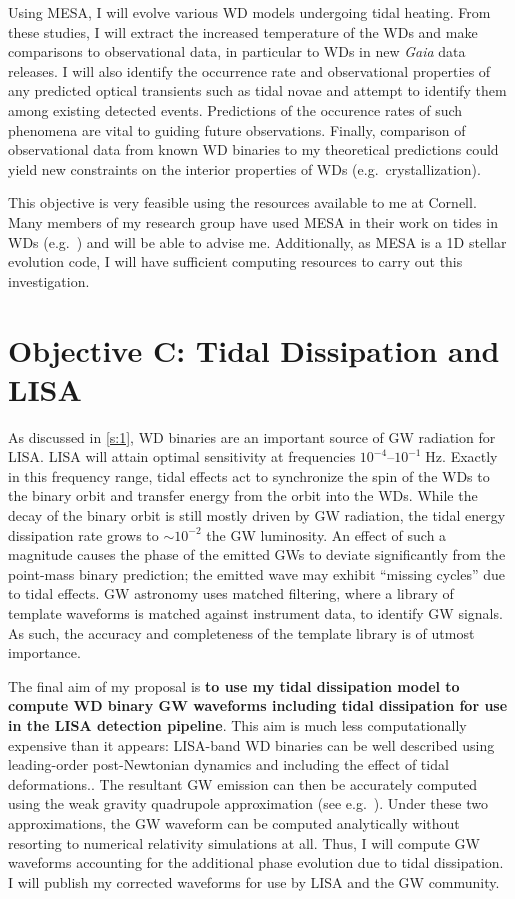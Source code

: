 \documentclass[12pt,
        usenames, %
        dvipsnames %
    ]{article}
\begin{document}
Using MESA, I will evolve various WD models undergoing tidal heating. From these
studies, I will extract the increased temperature of the WDs and make
comparisons to observational data, in particular to WDs in new \emph{Gaia} data
releases. I will also identify the occurrence rate and observational properties
of any predicted optical transients such as tidal novae and attempt to identify
them among existing detected events. Predictions of the occurence rates of such
phenomena are vital to guiding future observations. Finally, comparison of
observational data from known WD binaries to my theoretical predictions could
yield new constraints on the interior properties of WDs (e.g.\ crystallization).

This objective is very feasible using the resources available to me at Cornell.
Many members of my research group have used MESA in their work on tides in WDs
(e.g.\ \cite{fullerII,fullerIV,vick}) and will be able to advise me.
Additionally, as MESA is a 1D stellar evolution code, I will have sufficient
computing resources to carry out this investigation.

\section{Objective C\@: Tidal Dissipation and LISA}\label{s:4}

As discussed in \autoref{s:1}, WD binaries are an important source of GW
radiation for LISA\@. LISA will attain optimal sensitivity at frequencies
$10^{-4}$--$10^{-1}\;\mathrm{Hz}$\cite{LISA_band}. Exactly in this frequency
range, tidal effects act to synchronize the spin of the WDs to the binary orbit
and transfer energy from the orbit into the WDs. While the decay of the binary
orbit is still mostly driven by GW radiation, the tidal energy dissipation rate
grows to $\sim10^{-2}$ the GW luminosity\cite{fullerII,fullerIV}. An effect of
such a magnitude causes the phase of the emitted GWs to deviate significantly
from the point-mass binary prediction; the emitted wave may exhibit ``missing
cycles'' due to tidal effects\cite{fullerII}. GW astronomy uses matched
filtering, where a library of template waveforms is matched against instrument
data, to identify GW signals. As such, the accuracy and completeness of the
template library is of utmost importance.

The final aim of my proposal is \textbf{to use my tidal dissipation model to
compute WD binary GW waveforms including tidal dissipation for use in the LISA
detection pipeline}. This aim is much less computationally expensive than it
appears: LISA-band WD binaries can be well described using leading-order
post-Newtonian dynamics and including the effect of tidal
deformations.\cite{DWD_pointmass}. The resultant GW emission can then be
accurately computed using the weak gravity quadrupole approximation (see
e.g.~\cite{peters,lsst_wd}). Under these two approximations, the GW waveform can
be computed analytically without resorting to numerical relativity simulations
at all. Thus, I will compute GW waveforms accounting for the additional phase
evolution due to tidal dissipation. I will publish my corrected waveforms for
use by LISA and the GW community.
\end{document}
